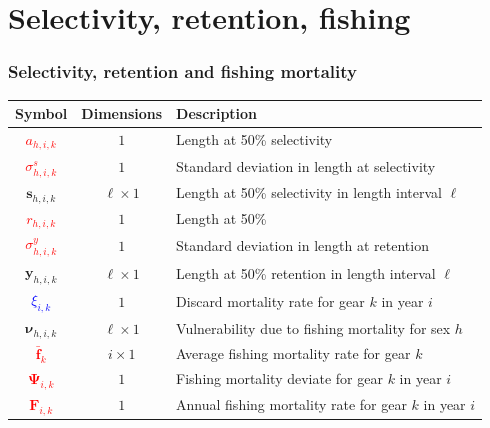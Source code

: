 \documentclass{beamer}
\begin{document}

\section{Selectivity, retention, fishing}


\begin{frame}
\frametitle{Selectivity, retention and fishing mortality}
\begin{table}
  \centering
  \begin{tabular}{ccl}
  \hline
  Symbol & Dimensions & Description \\
  \hline
      \textcolor{red}{$a_{h,i,k}$} & $1$ & Length at 50\% selectivity \\
      \textcolor{red}{$\sigma^s_{h,i,k}$} & $1$ & Standard deviation in length at selectivity \\
      $\boldsymbol{s}_{h,i,k}$ & $\ell \times 1$ & Length at 50\% selectivity in length interval $\ell$ \\
      \textcolor{red}{$r_{h,i,k}$} & $1$ & Length at 50\% \\
      \textcolor{red}{$\sigma^y_{h,i,k}$} & $1$ & Standard deviation in length at retention \\
      $\boldsymbol{y}_{h,i,k}$ & $\ell \times 1$ & Length at 50\% retention in length interval $\ell$ \\
      \textcolor{blue}{$\xi_{i,k}$} & $1$ & Discard mortality rate for gear $k$
      in year $i$ \\
      $\boldsymbol\nu_{h,i,k}$ & $\ell \times 1$ & Vulnerability due to fishing mortality for sex $h$ \\
      \textcolor{red}{$\bar{\boldsymbol{f}}_k$} & $i \times 1$ & Average fishing mortality rate for gear $k$ \\
      \textcolor{red}{$\boldsymbol\Psi_{i,k}$} & $1$ & Fishing mortality deviate for gear $k$ in year $i$ \\
      \textcolor{red}{$\boldsymbol{F}_{i,k}$} & $1$ & Annual fishing mortality rate for gear $k$ in year $i$ \\
  \hline
  \end{tabular}
\end{table}
\end{frame}
\end{document}
